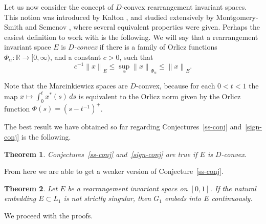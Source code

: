 \documentclass[numreferences]{kluwer}
\def\R{{\mathbb R}}
\def\normo#1{\left\|#1\right\|}
\newtheorem{Theorem}{Theorem}
\begin{document}
\begin{article}
Let us now consider the
concept of $D$-convex rearrangement invariant spaces.  This notion was
introduced by Kalton \cite{K}, and studied extensively by Montgomery-Smith
and Semenov \cite{MSe}, where several equivalent properties were given.  Perhaps
the easiest definition to work with is the following.  We will say that
a rearrangement invariant space $E$ is {\it $D$-convex\/} if there is a
family of Orlicz functions $\Phi_\alpha:\R \to [0,\infty)$, and a constant
$c>0$, such that
$$ c^{-1} \normo x_E \le  \sup_\alpha \normo x_{\Phi_\alpha} \le \normo x_E .$$

Note that the Marcinkiewicz spaces are
$D$-convex, because for each $0<t<1$ the map
$x \mapsto \int_0^t x^*(s) \, ds$ is equivalent to the Orlicz norm
given by the Orlicz function $\Phi(s) = (s-t^{-1})^+$.

The best result we have obtained so far regarding 
Conjectures~\ref{ss-conj} and~\ref{sign-conj} is the following.

\begin{Theorem}
\label{ss-sign}
Conjectures~\ref{ss-conj} and~\ref{sign-conj} are true if $E$ is $D$-convex.
\end{Theorem}

From here we are able to get a weaker version of Conjecture~\ref{ss-conj}.

\begin{Theorem}  
\label{g1}
Let $E$ be a rearrangement invariant space on $[0,1]$.
If the natural embedding $E \subset L_1$ is not strictly
singular, then $G_1$ embeds into $E$ continuously.
\end{Theorem}

We proceed with the proofs.


\end{article}
\end{document}
